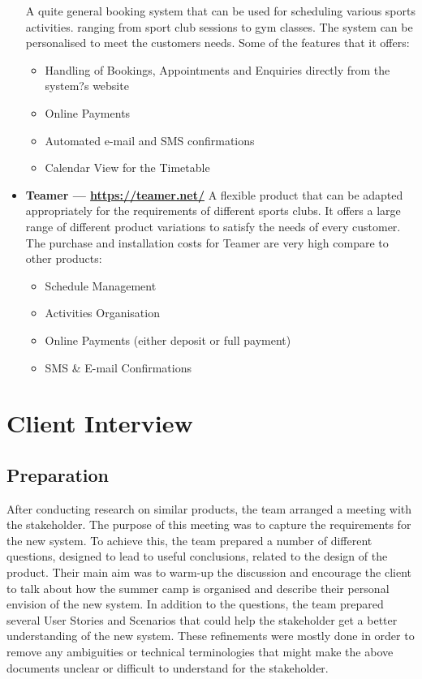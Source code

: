 \documentclass{l3proj}
\begin{document}
\begin{itemize}
A quite general booking system that can be used for scheduling various sports activities. ranging from sport club sessions to gym classes. The system can be personalised to meet the customers needs. Some of the features that it offers:
		\begin{itemize}
	\item Handling of Bookings, Appointments and Enquiries directly from the system?s website
	\item Online Payments
	\item Automated e-mail and SMS confirmations
	\item Calendar View for the Timetable
		\end{itemize}
\item \textbf{Teamer --- \url{https://teamer.net/}}
A flexible product that can be adapted appropriately for the requirements of different sports clubs. It offers a large range of different product variations to satisfy the needs of every customer. The purchase and installation costs for Teamer are very high compare to other products:
		\begin{itemize}
	\item Schedule Management
	\item Activities Organisation
	\item Online Payments (either deposit or full payment)
	\item SMS \& E-mail Confirmations
		\end{itemize}
\end{itemize}
\section{Client Interview}

\subsection{Preparation}
After conducting research on similar products, the team arranged a meeting with the stakeholder.  The purpose of this meeting was to capture the requirements for the new system. To achieve this, the team  prepared a number of different questions, designed to lead to useful conclusions, related to the design of the product. Their main aim was to warm-up the discussion and encourage the client to talk about how the summer camp is organised and describe their personal envision of the new system. In addition to the questions, the team prepared several User Stories and Scenarios that could help the stakeholder get a better understanding of the new system. These refinements were mostly done in order to remove any ambiguities or technical terminologies that might make the above documents unclear or difficult to understand for the stakeholder.
\end{document}
